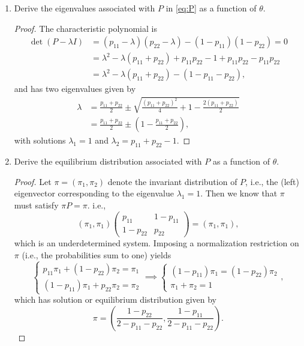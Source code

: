 \documentclass[oneside,reqno]{amsart}
\theoremstyle{definition}
\begin{document}
\begin{enumerate}[label=(\roman*)]
\item
Derive the eigenvalues associated with $P$ in \eqref{eq:P} as a function of $\theta$. 
\begin{proof}
The characteristic polynomial is
\begin{align*}
	\det(P - \lambda I) &= (p_{11} - \lambda )(p_{22} - \lambda) - (1-p_{11})(1-p_{22}) = 0 \\
	& = \lambda^2 - \lambda (p_{11} + p_{22}) + p_{11}p_{22} - 1 + p_{11} p_{22} - p_{11}p_{22} \\
	& = \lambda^2 - \lambda (p_{11} + p_{22}) - (1 - p_{11} - p_{22}),
\end{align*}
and has two eigenvalues given by
\begin{align*}
	\lambda &= \frac{p_{11} + p _{22}}{2} \pm \sqrt{\frac{(p_{11} + p _{22})^2}{4} +1 - \frac{2(p_{11} + p _{22})}{2}} \\
	&= \frac{p_{11} + p _{22}}{2} \pm \left(1 - \frac{p_{11} + p _{22}}{2} \right),
\end{align*}
with solutions $\lambda_1 = 1$ and $\lambda_2=  p_{11}+p_{22}-1$.
\end{proof}
\item
Derive the equilibrium distribution associated with $P$ as a function of $\theta$.
\begin{proof}
Let $\pi = (\pi_1, \pi_2)$ denote the invariant distribution of $P$, i.e., the (left) eigenvector corresponding to the eigenvalue $\lambda_1 = 1$. Then we know that $\pi$ must satisfy $\pi P = \pi$. i.e.,
\[
		(\pi_1,  \pi_1)
	 \begin{pmatrix}
		p_{11} & 1-p_{11} \\
		1- p_{22} & p_{22}
	\end{pmatrix}
	=(\pi_1,  \pi_1),
\]
which is an underdetermined system. Imposing a normalization restriction on $\pi$ (i.e., the probabilities sum to one) yields
\[
	\begin{cases}
		p_{11} \pi_1 + (1- p_{22}) \pi_2 = \pi_1 \\
		(1-p_{11}) \pi_1 + p_{22} \pi_2 = \pi_2
	\end{cases}
	\implies  
	\begin{cases}
		(1-p_{11}) \pi_1 =  (1- p_{22}) \pi_2 \\
		\pi_1 + \pi_2 = 1
	\end{cases},
\]
which has solution or equilibrium distribution given by
\[
	\pi = \left(\frac{1-p_{22}}{2-p_{11}  - p_{22}}, \frac{1-p_{11}}{2-p_{11} - p_{22}} \right).
\]
\end{proof}
\end{enumerate}
\end{document}
